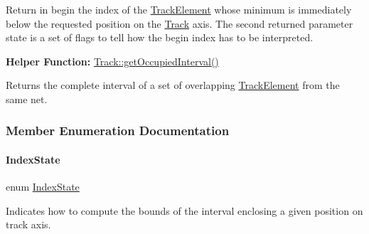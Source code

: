 Return in {\ttfamily begin} the index of the \mbox{\hyperlink{classKite_1_1TrackElement}{Track\+Element}} whose minimum is immediately below the requested {\ttfamily position} on the \mbox{\hyperlink{classKite_1_1Track}{Track}} axis. The second returned parameter {\ttfamily state} is a set of flags to tell how the {\ttfamily begin} index has to be interpreted.

{\bfseries Helper Function\+:} \mbox{\hyperlink{classKite_1_1Track_ae87a2e7c9632b60737162295542e3e93}{Track\+::get\+Occupied\+Interval()}}

Returns the complete interval of a set of overlapping \mbox{\hyperlink{classKite_1_1TrackElement}{Track\+Element}} from the same net. 

\subsubsection{Member Enumeration Documentation}
\mbox{\label{classKite_1_1Track_af4bdc8469c0fee386fc2ff30e0666bca}} 
\paragraph{\texorpdfstring{Index\+State}{IndexState}}
{\footnotesize\ttfamily enum \mbox{\hyperlink{classKite_1_1Track_af4bdc8469c0fee386fc2ff30e0666bca}{Index\+State}}}

Indicates how to compute the bounds of the interval enclosing a given {\ttfamily position} on track axis.


